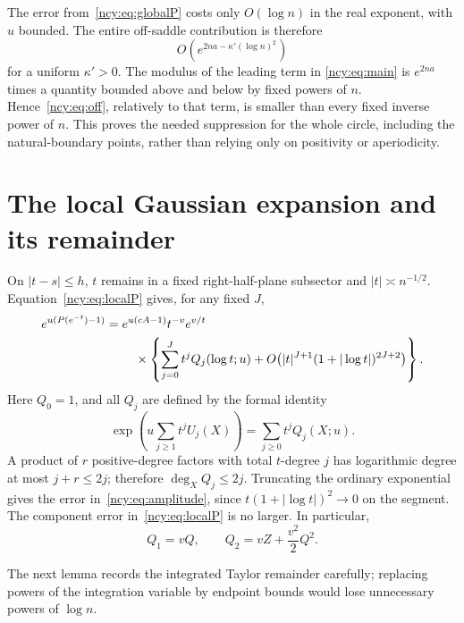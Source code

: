 \documentclass[11pt,letterpaper]{article}
\numberwithin{equation}{section}
\theoremstyle{remark}\newtheorem{remark}[theorem]{Remark}
\theoremstyle{definition}\newtheorem{definition}[theorem]{Definition}\theoremstyle{plain}
\begin{document}
The error from~\eqref{ncy:eq:globalP} costs only $O(\log n)$ in the real
exponent, with $u$ bounded. The entire off-saddle contribution is
therefore
\begin{equation}\label{ncy:eq:off}
 O\!\left(e^{2na-\kappa'(\log n)^2}\right)
\end{equation}
for a uniform $\kappa'>0$. The modulus of the leading term in
\eqref{ncy:eq:main} is $e^{2na}$ times a quantity bounded above and below
by fixed powers of $n$. Hence~\eqref{ncy:eq:off}, relatively to that term,
is smaller than every fixed inverse power of $n$. This proves the
needed suppression for the whole circle, including the natural-boundary
points, rather than relying only on positivity or aperiodicity.

\section{The local Gaussian expansion and its remainder}\label{ncy:sec:gaussian}
On $|t-s|\leq h$, $t$ remains in a fixed right-half-plane subsector
and $|t|\asymp n^{-1/2}$. Equation~\eqref{ncy:eq:localP} gives, for any
fixed $J$,
\begin{align}\label{ncy:eq:amplitude}
 e^{u(P(e^{-t})-1)}={}&e^{u(cA-1)}t^{-v}e^{v/t}\\
 &\quad\times\left\{\sum_{j=0}^Jt^jQ_j(\log t;u)
   +O\bigl(|t|^{J+1}(1+|\log t|)^{2J+2}\bigr)\right\}.\notag
\end{align}
Here $Q_0=1$, and all $Q_j$ are defined by the formal identity
\begin{equation}\label{ncy:eq:Qj}
 \exp\left(u\sum_{j\geq1}t^jU_j(X)\right)
             =\sum_{j\geq0}t^jQ_j(X;u).
\end{equation}
A product of $r$ positive-degree factors with total $t$-degree $j$
has logarithmic degree at most $j+r\leq2j$; therefore
$\deg_XQ_j\leq2j$. Truncating the ordinary exponential gives the error
in~\eqref{ncy:eq:amplitude}, since $t(1+|\log t|)^2\to0$ on the segment.
The component error in~\eqref{ncy:eq:localP} is no larger. In particular,
\begin{equation}\label{ncy:eq:Q12}
 Q_1=vQ,\qquad Q_2=vZ+\frac{v^2}{2}Q^2.
\end{equation}

The next lemma records the integrated Taylor remainder carefully;
replacing powers of the integration variable by endpoint bounds would
lose unnecessary powers of $\log n$.
\end{document}
